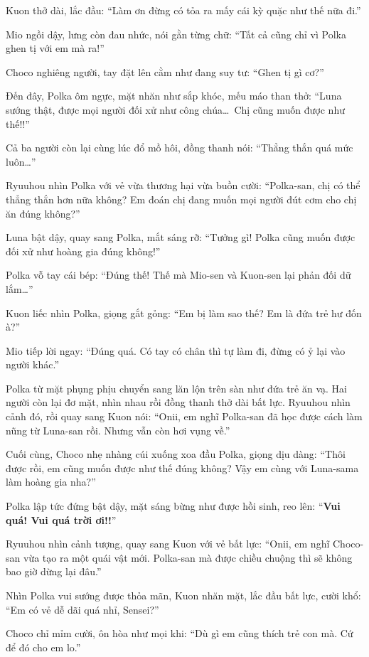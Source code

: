 \documentclass[../main.tex]{subfiles}
\begin{document}
Kuon thở dài, lắc đầu: ``Làm ơn đừng có tỏa ra mấy cái kỳ quặc như thế nữa đi.''

Mio ngồi dậy, lưng còn đau nhức, nói gằn từng chữ: ``Tất cả cũng chỉ vì Polka ghen tị với em mà ra!''

Choco nghiêng người, tay đặt lên cằm như đang suy tư: ``Ghen tị gì cơ?''

Đến đây, Polka ôm ngực, mặt nhăn như sắp khóc, mếu máo than thở: ``Luna sướng thật, được mọi người đối xử như công chúa\dots\ Chị cũng muốn được như thế!!''

Cả ba người còn lại cùng lúc đổ mồ hôi, đồng thanh nói: ``Thẳng thắn quá mức luôn\dots''

Ryuuhou nhìn Polka với vẻ vừa thương hại vừa buồn cười: ``Polka-san, chị có thể thẳng thắn hơn nữa không? Em đoán chị đang muốn mọi người đút cơm cho chị ăn đúng không?''

Luna bật dậy, quay sang Polka, mắt sáng rỡ: ``Tưởng gì! Polka cũng muốn được đối xử như hoàng gia đúng không!''

Polka vỗ tay cái bép: ``Đúng thế! Thế mà Mio-sen và Kuon-sen lại phản đối dữ lắm\dots''

Kuon liếc nhìn Polka, giọng gắt gỏng: ``Em bị làm sao thế? Em là đứa trẻ hư đốn à?''

Mio tiếp lời ngay: ``Đúng quá. Có tay có chân thì tự làm đi, đừng có ỷ lại vào người khác.''

Polka từ mặt phụng phịu chuyển sang lăn lộn trên sàn như đứa trẻ ăn vạ. Hai người còn lại đơ mặt, nhìn nhau rồi đồng thanh thở dài bất lực. Ryuuhou nhìn cảnh đó, rồi quay sang Kuon nói: ``Onii, em nghĩ Polka-san đã học được cách làm nũng từ Luna-san rồi. Nhưng vẫn còn hơi vụng về.''

Cuối cùng, Choco nhẹ nhàng cúi xuống xoa đầu Polka, giọng dịu dàng: ``Thôi được rồi, em cũng muốn được như thế đúng không? Vậy em cùng với Luna-sama làm hoàng gia nha?''

Polka lập tức đứng bật dậy, mặt sáng bừng như được hồi sinh, reo lên: ``\textbf{Vui quá! Vui quá trời ơi!!}''

Ryuuhou nhìn cảnh tượng, quay sang Kuon với vẻ bất lực: ``Onii, em nghĩ Choco-san vừa tạo ra một quái vật mới. Polka-san mà được chiều chuộng thì sẽ không bao giờ dừng lại đâu.''

Nhìn Polka vui sướng được thỏa mãn, Kuon nhăn mặt, lắc đầu bất lực, cười khổ: ``Em có vẻ dễ dãi quá nhỉ, Sensei?''

Choco chỉ mỉm cười, ôn hòa như mọi khi: ``Dù gì em cũng thích trẻ con mà. Cứ để đó cho em lo.''
\end{document}

